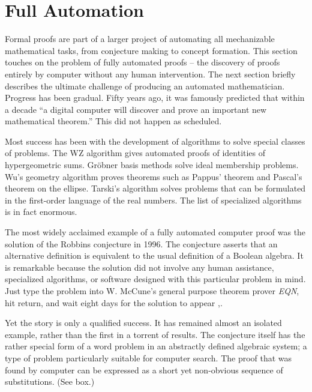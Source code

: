 \documentclass{llncs}
\begin{document}
\section{Full Automation}

Formal proofs are part of a larger project
of automating all 
mechanizable mathematical tasks, from conjecture making to concept formation.  
This section touches on the problem of fully automated proofs
-- the discovery of proofs
entirely by computer without any human intervention.  The next section
briefly describes the ultimate challenge of producing an automated mathematician.
Progress has been gradual.
Fifty years ago, it was famously predicted that
within a decade ``a digital computer will discover and prove
an important new mathematical theorem.''
This did not happen as scheduled.


Most success has been with
the development of algorithms to solve special classes
of problems.  The WZ algorithm  gives  automated proofs of identities
of hypergeometric sums.   Gr\"obner basis
methods solve ideal membership problems.
Wu's geometry algorithm proves theorems such as
Pappus' theorem
and Pascal's theorem on the ellipse.
Tarski's algorithm  solves
problems that can be formulated in the first-order language of the real numbers.
The list of specialized algorithms is in fact enormous.

The most widely acclaimed example of a fully automated computer proof
was the solution of the Robbins conjecture in 1996.  
The conjecture asserts that an alternative definition is equivalent
to the usual definition of a Boolean algebra.
It is remarkable
because the solution did not involve any human assistance,
specialized algorithms, or software
designed with this particular problem in mind.
Just type the problem into W. McCune's general purpose
theorem prover {\it EQN}, hit return, and wait
eight days for the solution to appear  \cite{Mc1},\cite{Mc2}.

Yet the story is only a qualified success.  It has
remained almost an isolated example, rather than the first in a torrent
of results.  The conjecture itself has the rather special form of a
word problem in an
abstractly defined algebraic system; a type of
problem particularly suitable for computer search.
The proof that was found by
computer can be expressed as a short yet non-obvious sequence
of substitutions. (See box.)
\end{document}
